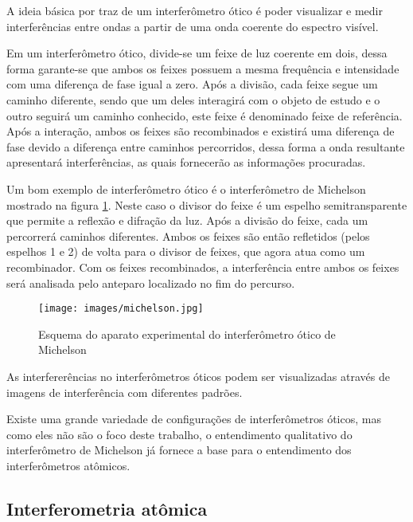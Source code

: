 	\par A ideia básica por traz de um interferômetro ótico é poder visualizar e medir interferências entre ondas a partir de uma onda coerente do espectro visível.

	\par Em um interferômetro ótico, divide-se um feixe de luz coerente em dois, dessa forma garante-se que ambos os feixes possuem a mesma frequência e intensidade com uma diferença de fase igual a zero. Após a divisão, cada feixe segue um caminho diferente, sendo que um deles interagirá com o objeto de estudo e o outro seguirá um caminho conhecido, este feixe é denominado feixe de referência. Após a interação, ambos os feixes são recombinados e existirá uma diferença de fase devido a diferença entre caminhos percorridos, dessa forma a onda resultante apresentará interferências, as quais fornecerão as informações procuradas\cite{ricardo_2}.
	
	\par Um bom exemplo de interferômetro ótico é o interferômetro de Michelson mostrado na figura \ref{michelson_ricardo}. Neste caso o divisor do feixe é um espelho semitransparente que permite a reflexão e difração da luz. Após a divisão do feixe, cada um percorrerá caminhos diferentes. Ambos os feixes são então refletidos (pelos espelhos 1 e 2) de volta para o divisor de feixes, que agora atua como um recombinador. Com os feixes recombinados, a interferência entre ambos os feixes será analisada pelo anteparo localizado no fim do percurso\cite{ricardo_1}\cite{ricardo_2}.	

	\begin{figure}[h!]
      \caption{Esquema do aparato experimental do interferômetro ótico de Michelson}
      \centering
      \texttt{[image: images/michelson.jpg]}
      \label{michelson_ricardo}
    \end{figure}

    \par As interfererências no interferômetros óticos podem ser visualizadas através de imagens de interferência com diferentes padrões. 
	
	\par Existe uma grande variedade de configurações de interferômetros óticos, mas como eles não são o foco deste trabalho, o entendimento qualitativo do interferômetro de Michelson já fornece a base para o entendimento dos interferômetros atômicos.

\subsection{Interferometria atômica}
	
